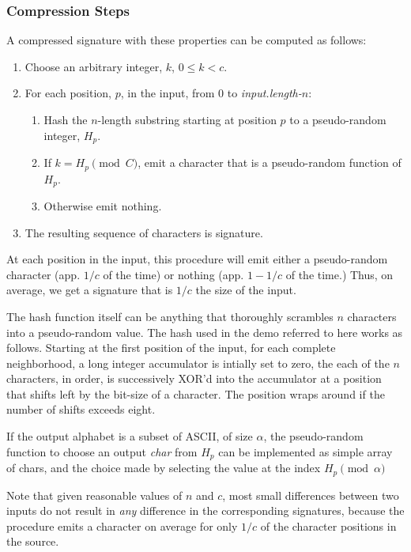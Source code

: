 \documentclass[html]{article}    %
\begin{document}
\subsubsection{Compression Steps}
A compressed signature with these properties can be computed as follows:
\begin{enumerate}
  	\item {
  		Choose an arbitrary integer, $k$, $0\leq k < c$.
	}
	\item{For each position, $p$, in the input, from $0$ to {\em input.length-$n$}:
		\begin{enumerate}
			\item {Hash the $n$-length substring starting at position $p$ to a pseudo-random integer, $H_{p}$.}
			\item { If $k=H_{p}\pmod C$, emit a character that is a pseudo-random function of $H_{p}$. }
			\item { Otherwise emit nothing.}
		\end{enumerate}
	}	
	\item {The resulting sequence of characters is signature.}
\end{enumerate}

At each position in the input, this procedure will emit either a pseudo-random character (app. $1/c$ of the time) or nothing (app. $1-1/c$ of the
time.) Thus, on average, we get a signature that is $1/c$ the size of the input.

The hash function itself can be anything that thoroughly scrambles $n$ characters into a pseudo-random value. 
The hash used in the demo referred to here works as follows. 
Starting at the first position of the input, 
for each complete neighborhood, 
a long integer accumulator is intially set to zero, 
the each of the $n$ characters, in order, 
is successively XOR'd into the accumulator at a position that shifts 
left by the bit-size of a character. The position wraps around if the number of shifts exceeds eight.

If the output alphabet is a subset of ASCII, of size $\alpha$, the pseudo-random function to choose an output {\em char} from $H_{p}$ can be implemented as simple 
array of chars, and the choice made by selecting the value at the index $H_{p}\pmod\alpha$ 

Note that given reasonable values of $n$ and $c$, most small differences between two inputs do not result in {\em any} difference in the 
corresponding signatures, because the procedure emits a character on average for only $1/c$ of the character positions in the source.
\end{document}
